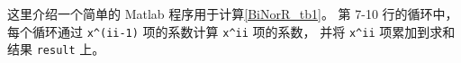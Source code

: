 
这里介绍一个简单的 Matlab 程序用于计算\autoref{BiNorR_tb1}。 第 7-10 行的循环中， 每个循环通过 \texttt{x\^{}(ii-1)} 项的系数计算 \texttt{x\^{}ii} 项的系数， 并将 \texttt{x\^{}ii} 项累加到求和结果 \texttt{result} 上。

